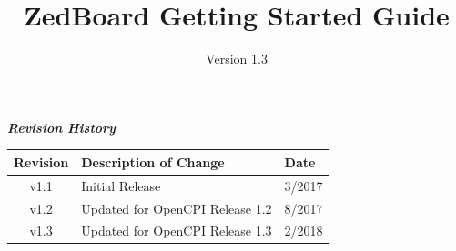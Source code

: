\def\docTitle{ZedBoard Getting Started Guide}
\def\docVersion{1.3}

\date{Version \docVersion} %
\title{\docTitle}
\usepackage[T1]{fontenc} %
\usepackage{graphicx}
\graphicspath{ {figures/} }

\maketitle
\newpage

	\begin{center}
	\textit{\textbf{Revision History}}
		\begin{table}[H]
		\label{table:revisions} %
			\begin{tabularx}{\textwidth}{|c|X|l|}
			\hline
			\rowcolor{blue}
			\textbf{Revision} & \textbf{Description of Change} & \textbf{Date} \\
		    \hline
		    v1.1 & Initial Release & 3/2017 \\
            \hline
            v1.2 & Updated for OpenCPI Release 1.2 & 8/2017 \\
            \hline
            v1.3 & Updated for OpenCPI Release 1.3 & 2/2018 \\
            \hline
			\end{tabularx}
		\end{table}
	\end{center}

